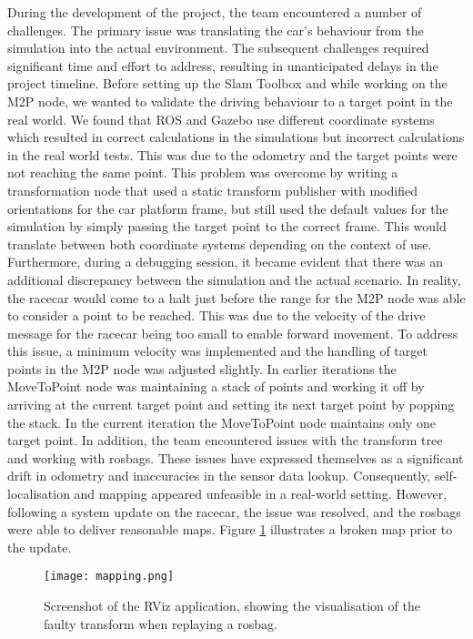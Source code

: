 During the development of the project, the team encountered a number of challenges. The primary issue was translating the car's behaviour from the simulation into the actual environment. The subsequent challenges required significant time and effort to address, resulting in unanticipated delays in the project timeline.
\newline
Before setting up the Slam Toolbox and while working on the M2P node, we wanted to validate the driving behaviour to a target point in the real world. We found that ROS and Gazebo use different coordinate systems which resulted in correct calculations in the simulations but incorrect calculations in the real world tests. This was due to the odometry and the target points were not reaching the same point. This problem was overcome by writing a transformation node that used a static transform publisher with modified orientations for the car platform frame, but still used the default values for the simulation by simply passing the target point to the correct frame. This would translate between both coordinate systems depending on the context of use.\\
Furthermore, during a debugging session, it became evident that there was an additional discrepancy between the simulation and the actual scenario. In reality, the racecar would come to a halt just before the range for the M2P node was able to consider a point to be reached. This was due to the velocity of the drive message for the racecar being too small to enable forward movement. To address this issue, a minimum velocity was implemented and the handling of target points in the M2P node was adjusted slightly. In earlier iterations the MoveToPoint node was maintaining a stack of points and working it off by arriving at the current target point and setting its next target point by popping the stack. In the current iteration the MoveToPoint node maintains only one target point.
\newline
In addition, the team encountered issues with the transform tree and working with rosbags. These issues have expressed themselves as a significant drift in odometry and inaccuracies in the sensor data lookup. Consequently, self-localisation and mapping appeared unfeasible in a real-world setting. However, following a system update on the racecar, the issue was resolved, and the rosbags were able to deliver reasonable maps. Figure \ref{fig:map} illustrates a broken map prior to the update.

\begin{figure}[htp]
	\vskip 0.2in
	\begin{center}
		\centerline{\texttt{[image: mapping.png]}}
		\caption{Screenshot of the RViz application, showing the visualisation of the faulty transform when replaying a rosbag.}
		\label{fig:map}
	\end{center}
	\vskip -0.2in
\end{figure}